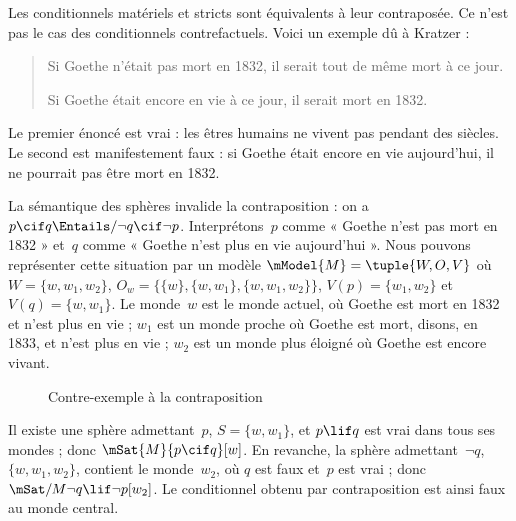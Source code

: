 \documentclass[../../../include/open-logic-section]{subfiles}
\begin{document}


Les conditionnels matériels et stricts sont équivalents à leur
contraposée. Ce n'est pas le cas des conditionnels contrefactuels.
Voici un exemple dû à Kratzer :
\begin{quote}
  Si Goethe n'était pas mort en 1832, il serait tout de même mort à ce
  jour.

  Si Goethe était encore en vie à ce jour, il serait mort en 1832.
\end{quote}
Le premier énoncé est vrai : les êtres humains ne vivent pas pendant
des siècles. Le second est manifestement faux : si Goethe était
encore en vie aujourd'hui, il ne pourrait pas être mort en 1832.

\begin{ex}
  La sémantique des sphères invalide la contraposition : on a $p
  \cif q \Entails/ \lnot q \cif \lnot p$. Interprétons~$p$ comme
  « Goethe n'est pas mort en 1832 » et~$q$ comme « Goethe n'est plus en
  vie aujourd'hui ». Nous pouvons représenter cette situation par un
  modèle $\mModel{M} = \tuple{W, O, V}$ où $W =
  \{w, w_1, w_2\}$, $O_w = \{\{w\}, \{w, w_1\}, \{w, w_1, w_2\}\}$,
  $V(p) = \{w_1, w_2\}$ et $V(q) = \{w, w_1\}$. %
%
%
   Le monde~$w$ est le monde actuel, où Goethe est mort en 1832
  et n'est plus en vie ; $w_1$ est un monde proche où Goethe est mort,
  disons, en 1833, et n'est plus en vie ; $w_2$ est un monde plus
  éloigné où Goethe est encore vivant.
\begin{figure}
\begin{center}
\caption{Contre-exemple à la contraposition}
\end{center}
\end{figure}
Il existe une sphère admettant~$p$, $S =
\{w, w_1\}$, et $p \lif q$ est vrai dans tous ses mondes ; donc
$\mSat{M}{p \cif q}[w]$. En revanche, la sphère admettant~$\lnot q$,
$\{w, w_1, w_2\}$, contient le monde~$w_2$, où
$q$ est faux et~$p$ est vrai ; donc
$\mSat/{M}{\lnot q \lif \lnot p}[w_2]$. Le conditionnel obtenu par
contraposition est ainsi faux au monde central.
\end{ex}
\end{document}
